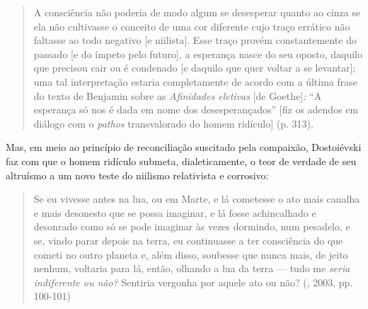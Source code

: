 \begin{quote}
A consciência não poderia de modo algum se desesperar quanto ao cinza se
ela não cultivasse o conceito de uma cor diferente cujo traço errático
não faltasse ao todo negativo {[}e niilista{]}. Esse traço provém
constantemente do passado {[}e do ímpeto pelo futuro{]}, a esperança
nasce do seu oposto, daquilo que precisou cair ou é condenado {[}e
daquilo que quer voltar a se levantar{]}; uma tal interpretação estaria
completamente de acordo com a última frase do texto de Benjamin sobre as
\emph{Afinidades eletivas} {[}de Goethe{]}\emph{:} ``A esperança só nos
é dada em nome dos desesperançados'' {[}fiz os adendos em diálogo com o
\emph{pathos} transvalorado do homem ridículo{]} (p. 313).
\end{quote}

Mas, em meio ao princípio de reconciliação suscitado pela compaixão,
Dostoiévski faz com que o homem ridículo submeta, dialeticamente, o teor
de verdade de seu altruísmo a um novo teste do niilismo relativista e
corrosivo:

\begin{quote}
Se eu vivesse antes na lua, ou em Marte, e lá cometesse o ato mais
canalha e mais desonesto que se possa imaginar, e lá fosse achincalhado
e desonrado como só se pode imaginar às vezes dormindo, num pesadelo, e
se, vindo parar depois na terra, eu continuasse a ter consciência do que
cometi no outro planeta e, além disso, soubesse que nunca mais, de jeito
nenhum, voltaria para lá, então, olhando a lua da terra --- tudo me
\emph{seria indiferente ou não?} Sentiria vergonha por aquele ato ou
não? (, 2003, pp. 100-101)
\end{quote}

